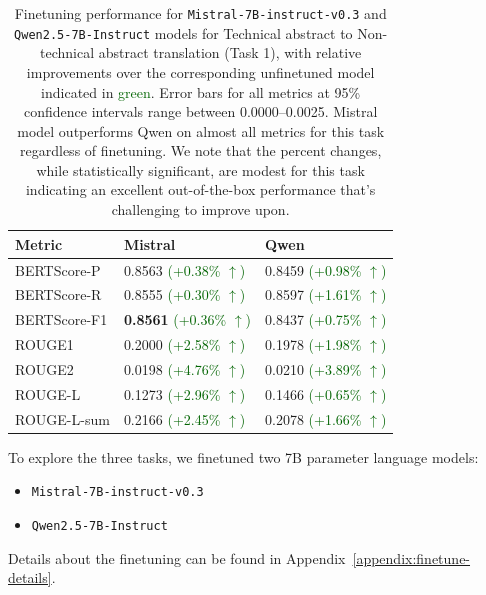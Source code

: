 \documentclass[11pt]{article}
\begin{document}
\begin{table}[t]
\centering
\small
\begin{tabular}{lll}
\toprule
Metric & Mistral & Qwen\\
\midrule
BERTScore-P & 0.8563 \textcolor{darkgreen}{(+0.38\% $\uparrow$)} & 0.8459 \textcolor{darkgreen}{(+0.98\% $\uparrow$)} \\
BERTScore-R    & 0.8555 \textcolor{darkgreen}{(+0.30\% $\uparrow$)} & 0.8597 \textcolor{darkgreen}{(+1.61\% $\uparrow$)} \\
BERTScore-F1        & \textbf{0.8561} \textcolor{darkgreen}{(+0.36\% $\uparrow$)} & 0.8437 \textcolor{darkgreen}{(+0.75\% $\uparrow$)} \\
ROUGE1              & 0.2000 \textcolor{darkgreen}{(+2.58\% $\uparrow$)} & 0.1978 \textcolor{darkgreen}{(+1.98\% $\uparrow$)} \\
ROUGE2              & 0.0198 \textcolor{darkgreen}{(+4.76\% $\uparrow$)} & 0.0210 \textcolor{darkgreen}{(+3.89\% $\uparrow$)} \\
ROUGE-L             & 0.1273 \textcolor{darkgreen}{(+2.96\% $\uparrow$)} & 0.1466 \textcolor{darkgreen}{(+0.65\% $\uparrow$)} \\
ROUGE-L-sum         & 0.2166 \textcolor{darkgreen}{(+2.45\% $\uparrow$)} & 0.2078 \textcolor{darkgreen}{(+1.66\% $\uparrow$)} \\
\bottomrule
\end{tabular}
\caption{Finetuning performance for \texttt{Mistral-7B-instruct-v0.3}
 and \texttt{Qwen2.5-7B-Instruct}
 models for Technical abstract to Non-technical abstract translation (Task 1), with relative improvements over the corresponding unfinetuned model indicated in \textcolor{darkgreen}{green}. Error bars for all metrics at 95\% confidence intervals range between 0.0000--0.0025. Mistral model outperforms Qwen on almost all metrics for this task regardless of finetuning. We note that the percent changes, while statistically significant, are modest for this task indicating an excellent out-of-the-box performance that's challenging to improve upon.}
\label{tab:eval_tech2nontech}
\end{table}

To explore the three tasks, we finetuned two 7B parameter language models:
\begin{itemize}[noitemsep,topsep=0pt]
\item \texttt{Mistral-7B-instruct-v0.3}~\cite{jiang2023mistral7b}
\item \texttt{Qwen2.5-7B-Instruct}~\cite{qwen2}
\end{itemize}
\noindent Details about the finetuning can be found in Appendix~\ref{appendix:finetune-details}.
\end{document}
